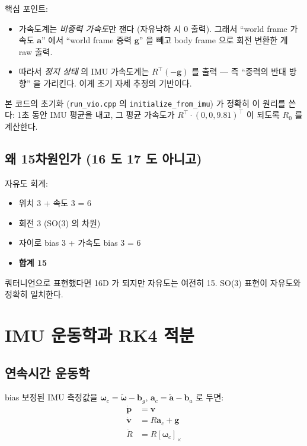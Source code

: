 \documentclass[11pt,a4paper,oneside]{report}
\newcommand{\T}{^{\!\top}}
\newcommand{\skewop}[1]{[#1]_{\!\times}}
\begin{document}
핵심 포인트:
\begin{itemize}
\item 가속도계는 \emph{비중력 가속도}만 잰다 (자유낙하 시 0 출력). 그래서 ``world frame 가속도 \(\bm{a}\)'' 에서 ``world frame 중력 \(\bm{g}\)'' 을 빼고 body frame 으로 회전 변환한 게 raw 출력.
\item 따라서 \emph{정지 상태} 의 IMU 가속도계는 \(R\T(-\bm{g})\) 를 출력 — 즉 ``중력의 반대 방향'' 을 가리킨다. 이게 초기 자세 추정의 기반이다.
\end{itemize}

본 코드의 초기화 (\texttt{run\_vio.cpp} 의 \texttt{initialize\_from\_imu}) 가 정확히 이 원리를 쓴다: 1초 동안 IMU 평균을 내고, 그 평균 가속도가 \(R\T \cdot (0,0,9.81)\T\) 이 되도록 \(R_0\) 를 계산한다.

\subsection{왜 15차원인가 (16 도 17 도 아니고)}

자유도 회계:
\begin{itemize}
\item 위치 3 + 속도 3 = 6
\item 회전 3 (SO(3) 의 차원)
\item 자이로 bias 3 + 가속도 bias 3 = 6
\item \textbf{합계 15}
\end{itemize}

쿼터니언으로 표현했다면 16D 가 되지만 자유도는 여전히 15. SO(3) 표현이 자유도와 정확히 일치한다.

\section{IMU 운동학과 RK4 적분}

\subsection{연속시간 운동학}

bias 보정된 IMU 측정값을 \(\bm{\omega}_c = \tilde{\bm{\omega}} - \bm{b}_g\), \(\bm{a}_c = \tilde{\bm{a}} - \bm{b}_a\) 로 두면:
\begin{align}
\dot{\bm{p}} &= \bm{v} \\
\dot{\bm{v}} &= R \bm{a}_c + \bm{g} \\
\dot{R} &= R \skewop{\bm{\omega}_c}
\end{align}
\end{document}

